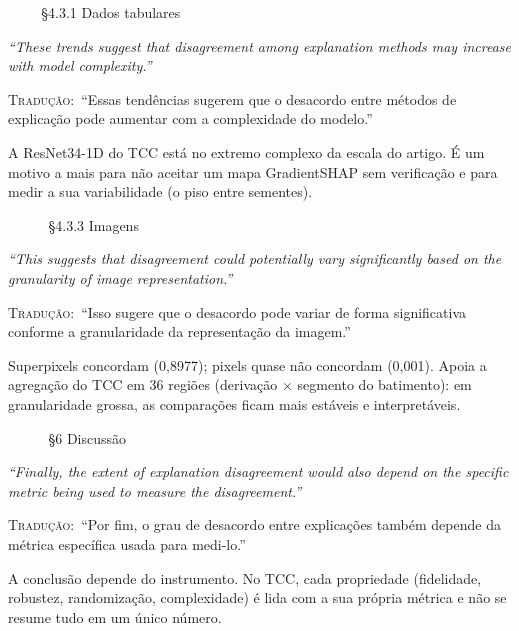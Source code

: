 \documentclass[11pt,a4paper]{article}
\newcommand{\pagechip}[1]{{\setlength{\fboxsep}{1.5pt}\colorbox{cAcc}{\textcolor{white}{\scriptsize\texttt{#1}}}}}
\newenvironment{origquote}{\par\itshape\small}{\par}
\newenvironment{tradquote}{\par\small\textsc{Tradução:}\ }{\par}
\newcommand{\explab}[1]{\par\smallskip{\small\color{cAcc}\textbf{\MakeUppercase{#1}}}\par}
\begin{document}
\begin{citacard}{\pagechip{p. 8} §4.3.1 Dados tabulares}
\begin{origquote}“These trends suggest that disagreement among explanation methods may increase with model complexity.”\end{origquote}
\begin{tradquote}“Essas tendências sugerem que o desacordo entre métodos de explicação pode aumentar com a complexidade do modelo.”\end{tradquote}
\explab{Explicação}
A ResNet34-1D do TCC está no extremo complexo da escala do artigo. É um motivo a mais para não aceitar um mapa GradientSHAP sem verificação e para medir a sua variabilidade (o piso entre sementes).
\end{citacard}

\begin{citacard}{\pagechip{p. 11} §4.3.3 Imagens}
\begin{origquote}“This suggests that disagreement could potentially vary significantly based on the granularity of image representation.”\end{origquote}
\begin{tradquote}“Isso sugere que o desacordo pode variar de forma significativa conforme a granularidade da representação da imagem.”\end{tradquote}
\explab{Explicação}
Superpixels concordam (0,8977); pixels quase não concordam (0,001). Apoia a agregação do TCC em 36 regiões (derivação $\times$ segmento do batimento): em granularidade grossa, as comparações ficam mais estáveis e interpretáveis.
\end{citacard}

\begin{citacard}{\pagechip{p. 15} §6 Discussão}
\begin{origquote}“Finally, the extent of explanation disagreement would also depend on the specific metric being used to measure the disagreement.”\end{origquote}
\begin{tradquote}“Por fim, o grau de desacordo entre explicações também depende da métrica específica usada para medi-lo.”\end{tradquote}
\explab{Explicação}
A conclusão depende do instrumento. No TCC, cada propriedade (fidelidade, robustez, randomização, complexidade) é lida com a sua própria métrica e não se resume tudo em um único número.
\end{citacard}
\end{document}
